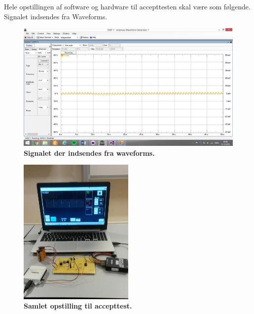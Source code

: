 Hele opstillingen af software og hardware til accepttesten skal være som følgende. Signalet indsendes fra Waveforms. 
\begin{figure}[H]
\includegraphics[width =1.0\textwidth , center]{billeder/waveforms}
\caption{\textbf{Signalet der indsendes fra waveforms.}}
\end{figure}
\begin{figure}[H]
\includegraphics[width =0.5\textwidth , center]{billeder/ATopstilling}
\caption{\textbf{Samlet opstilling til accepttest.}}
\end{figure}
